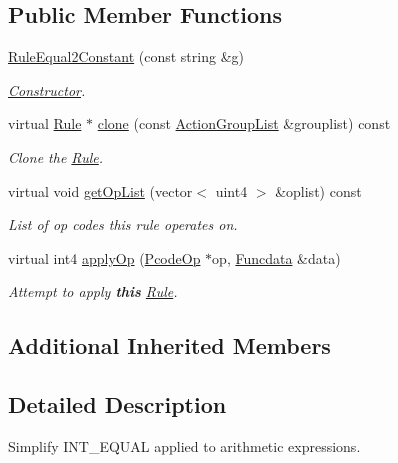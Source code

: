 \subsection*{Public Member Functions}
\begin{DoxyCompactItemize}
\item 
\mbox{\hyperlink{class_rule_equal2_constant_a72c73531b7c0243dde3a1ae23eeea678}{Rule\+Equal2\+Constant}} (const string \&g)
\begin{DoxyCompactList}\small\item\em \mbox{\hyperlink{class_constructor}{Constructor}}. \end{DoxyCompactList}\item 
virtual \mbox{\hyperlink{class_rule}{Rule}} $\ast$ \mbox{\hyperlink{class_rule_equal2_constant_a69a9a14451113af78875906090e19929}{clone}} (const \mbox{\hyperlink{class_action_group_list}{Action\+Group\+List}} \&grouplist) const
\begin{DoxyCompactList}\small\item\em Clone the \mbox{\hyperlink{class_rule}{Rule}}. \end{DoxyCompactList}\item 
virtual void \mbox{\hyperlink{class_rule_equal2_constant_afe6e48806c7403838f841ee463e15e7b}{get\+Op\+List}} (vector$<$ uint4 $>$ \&oplist) const
\begin{DoxyCompactList}\small\item\em List of op codes this rule operates on. \end{DoxyCompactList}\item 
virtual int4 \mbox{\hyperlink{class_rule_equal2_constant_a99da234ae056794a853e6eb2466096e7}{apply\+Op}} (\mbox{\hyperlink{class_pcode_op}{Pcode\+Op}} $\ast$op, \mbox{\hyperlink{class_funcdata}{Funcdata}} \&data)
\begin{DoxyCompactList}\small\item\em Attempt to apply {\bfseries{this}} \mbox{\hyperlink{class_rule}{Rule}}. \end{DoxyCompactList}\end{DoxyCompactItemize}
\subsection*{Additional Inherited Members}


\subsection{Detailed Description}
Simplify I\+N\+T\+\_\+\+E\+Q\+U\+AL applied to arithmetic expressions. 

